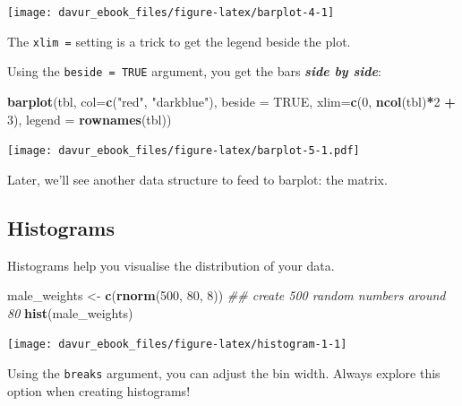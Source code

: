 \documentclass[]{book}
\newenvironment{Shaded}{\begin{snugshade}}{\end{snugshade}}
\newcommand{\CommentTok}[1]{\textcolor[rgb]{0.56,0.35,0.01}{\textit{#1}}}
\newcommand{\DataTypeTok}[1]{\textcolor[rgb]{0.13,0.29,0.53}{#1}}
\newcommand{\DecValTok}[1]{\textcolor[rgb]{0.00,0.00,0.81}{#1}}
\newcommand{\KeywordTok}[1]{\textcolor[rgb]{0.13,0.29,0.53}{\textbf{#1}}}
\newcommand{\NormalTok}[1]{#1}
\newcommand{\OperatorTok}[1]{\textcolor[rgb]{0.81,0.36,0.00}{\textbf{#1}}}
\newcommand{\OtherTok}[1]{\textcolor[rgb]{0.56,0.35,0.01}{#1}}
\newcommand{\StringTok}[1]{\textcolor[rgb]{0.31,0.60,0.02}{#1}}
\begin{document}
\begin{center}\texttt{[image: davur\_ebook\_files/figure-latex/barplot-4-1]} \end{center}

The \texttt{xlim\ =} setting is a trick to get the legend beside the plot.

Using the \texttt{beside\ =\ TRUE} argument, you get the bars \textbf{\emph{side by side}}:

\begin{Shaded}
\begin{Highlighting}[]
\KeywordTok{barplot}\NormalTok{(tbl, }
        \DataTypeTok{col=}\KeywordTok{c}\NormalTok{(}\StringTok{"red"}\NormalTok{, }\StringTok{"darkblue"}\NormalTok{), }
        \DataTypeTok{beside =} \OtherTok{TRUE}\NormalTok{, }
        \DataTypeTok{xlim=}\KeywordTok{c}\NormalTok{(}\DecValTok{0}\NormalTok{, }\KeywordTok{ncol}\NormalTok{(tbl)}\OperatorTok{*}\DecValTok{2} \OperatorTok{+}\StringTok{ }\DecValTok{3}\NormalTok{), }
        \DataTypeTok{legend =} \KeywordTok{rownames}\NormalTok{(tbl))}
\end{Highlighting}
\end{Shaded}

\texttt{[image: davur\_ebook\_files/figure-latex/barplot-5-1.pdf]}

Later, we'll see another data structure to feed to barplot: the matrix.

\hypertarget{histograms}{%
\subsection{Histograms}\label{histograms}}

Histograms help you visualise the distribution of your data.

\begin{Shaded}
\begin{Highlighting}[]
\NormalTok{male_weights <-}\StringTok{ }\KeywordTok{c}\NormalTok{(}\KeywordTok{rnorm}\NormalTok{(}\DecValTok{500}\NormalTok{, }\DecValTok{80}\NormalTok{, }\DecValTok{8}\NormalTok{)) }\CommentTok{## create 500 random numbers around 80}
\KeywordTok{hist}\NormalTok{(male_weights)}
\end{Highlighting}
\end{Shaded}

\begin{center}\texttt{[image: davur\_ebook\_files/figure-latex/histogram-1-1]} \end{center}

Using the \texttt{breaks} argument, you can adjust the bin width. Always explore this option when creating histograms!
\end{document}
